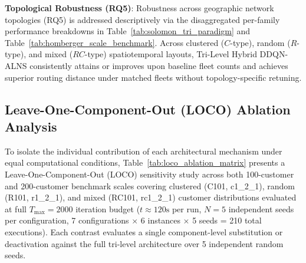 \documentclass{ieeeaccess}
\begin{document}
\textbf{Topological Robustness (RQ5)}: Robustness across geographic network topologies (RQ5) is addressed descriptively via the disaggregated per-family performance breakdowns in Table~\ref{tab:solomon_tri_paradigm} and Table~\ref{tab:homberger_scale_benchmark}. Across clustered ($C$-type), random ($R$-type), and mixed ($RC$-type) spatiotemporal layouts, Tri-Level Hybrid DDQN-ALNS consistently attains or improves upon baseline fleet counts and achieves superior routing distance under matched fleets without topology-specific retuning.

\subsection{Leave-One-Component-Out (LOCO) Ablation Analysis}
\label{sec:ablation_results}

To isolate the individual contribution of each architectural mechanism under equal computational conditions, Table~\ref{tab:loco_ablation_matrix} presents a Leave-One-Component-Out (LOCO) sensitivity study across both 100-customer and 200-customer benchmark scales covering clustered (C101, c1\_2\_1), random (R101, r1\_2\_1), and mixed (RC101, rc1\_2\_1) customer distributions evaluated at full $T_{\max}=2000$ iteration budget ($t \approx 120\text{s}$ per run, $N=5$ independent seeds per configuration, 7 configurations $\times$ 6 instances $\times$ 5 seeds = 210 total executions). Each contrast evaluates a single component-level substitution or deactivation against the full tri-level architecture over 5 independent random seeds.
\end{document}
